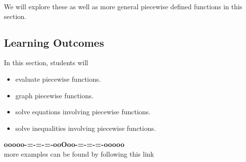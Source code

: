 \documentclass{ximera}
\begin{document}
We will explore these as well as more general piecewise defined functions in this section. \\






\subsection*{Learning Outcomes}



\begin{sectionOutcomes}
In this section, students will 

\begin{itemize}
\item evaluate piecewise functions.
\item graph piecewise functions.
\item solve equations involving piecewise functions.
\item solve inequalities involving piecewise functions.
\end{itemize}
\end{sectionOutcomes}


















\begin{center}
\textbf{\textcolor{green!50!black}{ooooo-=-=-=-ooOoo-=-=-=-ooooo}} \\

more examples can be found by following this link\\ 

\end{center}
\end{document}
